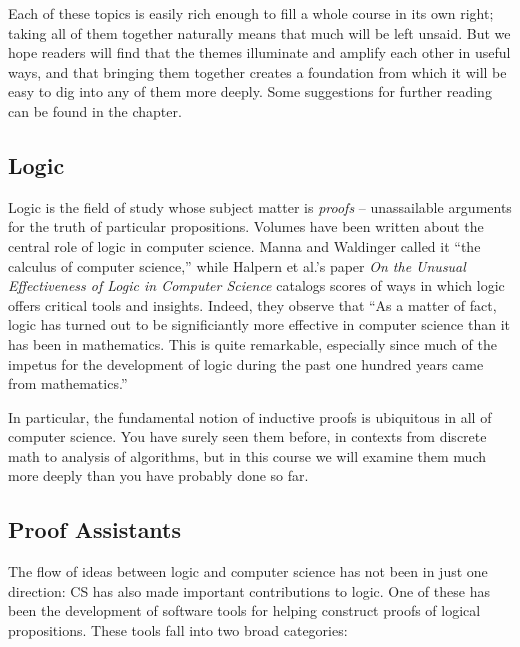 \documentclass[12pt]{report}
\begin{document}
    Each of these topics is easily rich enough to fill a whole course
    in its own right; taking all of them together naturally means that
    much will be left unsaid.  But we hope readers will find that the
    themes illuminate and amplify each other in useful ways, and that
    bringing them together creates a foundation from which it will be
    easy to dig into any of them more deeply.  Some suggestions for
    further reading can be found in the  chapter. 

\subsection{Logic}



 Logic is the field of study whose subject matter is \textit{proofs} --
    unassailable arguments for the truth of particular propositions.
    Volumes have been written about the central role of logic in
    computer science.  Manna and Waldinger called it ``the calculus of
    computer science,'' while Halpern et al.'s paper \textit{On the Unusual
    Effectiveness of Logic in Computer Science} catalogs scores of
    ways in which logic offers critical tools and insights.  Indeed,
    they observe that ``As a matter of fact, logic has turned out to be
    significiantly more effective in computer science than it has been
    in mathematics.  This is quite remarkable, especially since much
    of the impetus for the development of logic during the past one
    hundred years came from mathematics.''


    In particular, the fundamental notion of inductive proofs is
    ubiquitous in all of computer science.  You have surely seen them
    before, in contexts from discrete math to analysis of algorithms,
    but in this course we will examine them much more deeply than you
    have probably done so far. 

\subsection{Proof Assistants}



 The flow of ideas between logic and computer science has not been
    in just one direction: CS has also made important contributions to
    logic.  One of these has been the development of software tools
    for helping construct proofs of logical propositions.  These tools
    fall into two broad categories:
\end{document}

